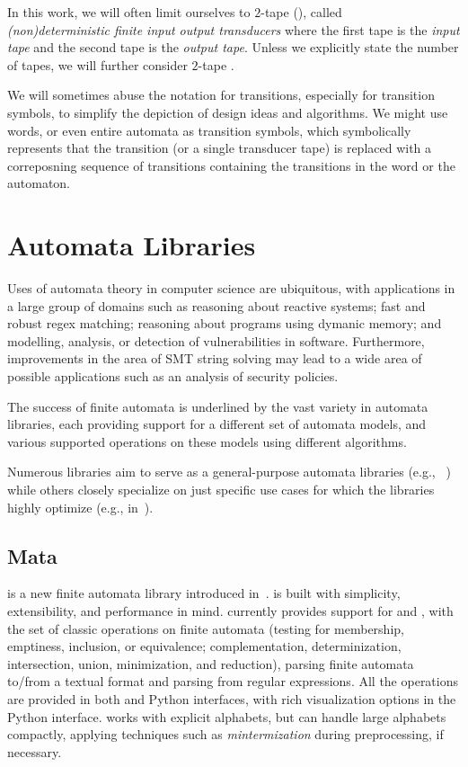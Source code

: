 
In this work, we will often limit ourselves to $2$-tape \nfts (\dfts), called\\\emph{(non)deterministic finite input output transducers} where the first tape is the \emph{input tape} and the second tape is the \emph{output tape}.
Unless we explicitly state the number of tapes, we will further consider $2$-tape \nfts.

We will sometimes abuse the notation for transitions, especially for transition symbols, to simplify the depiction of design ideas and algorithms.
We might use words, or even entire automata as transition symbols, which symbolically represents that the transition (or a single transducer tape) is replaced with a correposning sequence of transitions containing the transitions in the word or the automaton.

\chapter{Automata Libraries}
\label{chap:finite_automata}

Uses of automata theory in computer science are ubiquitous, with applications in a large group of domains such as reasoning about reactive systems; fast and robust regex matching; reasoning about programs using dymanic memory; and modelling, analysis, or detection of vulnerabilities in software.
Furthermore, improvements in the area of SMT string solving may lead to a wide area of possible applications such as an analysis of security policies.

The success of finite automata is underlined by the vast variety in automata libraries, each providing support for a different set of automata models, and various supported operations on these models using different algorithms.

Numerous libraries aim to serve as a general-purpose automata libraries (e.g., ~\cite{automatanet, tacas24_mata_10.1007/978-3-031-57249-4_7,fado}) while others closely specialize on just specific use cases for which the libraries highly optimize (e.g., in~\cite{mona,automatajar}).

\section{Mata}

\mata is a new finite automata library introduced in~\cite{tacas24_mata_10.1007/978-3-031-57249-4_7}.
\mata is built with simplicity, extensibility, and performance in mind.
\mata currently provides support for \dfas and \nfas, with the set of classic operations on finite automata (testing for membership, emptiness, inclusion, or equivalence; complementation, determinization, intersection, union, minimization, and reduction),
parsing finite automata to/from a textual format and parsing \nfas from regular expressions.
All the operations are provided in both \cpp and Python interfaces, with rich visualization options in the Python interface.
\mata works with explicit alphabets, but can handle large alphabets compactly, applying techniques such as \emph{mintermization} during preprocessing, if necessary.


